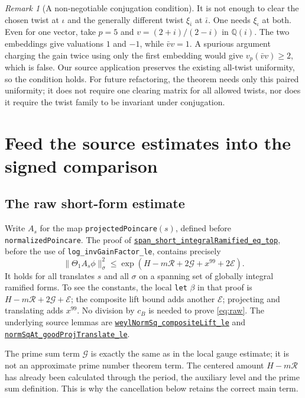 \documentclass[11pt,letterpaper]{article}
\theoremstyle{remark}\newtheorem{remark}[theorem]{Remark}
\newcommand{\R}{\mathcal R}\newcommand{\E}{\mathcal E}\newcommand{\Lfour}{\mathcal L}\newcommand{\K}{\mathcal K}\newcommand{\G}{\mathcal G}\newcommand{\Gr}{\operatorname{Gram}}\newcommand{\rk}{\operatorname{rank}}\newcommand{\Height}{\operatorname{HeightLe}}
\newcommand{\src}[3]{\href{https://github.com/VladimirReshetnikov/ProveIt/blob/89d12dd40424f1217fd818d84877b3da52396a3b/Analysis/GeneralizedRiemannHypothesis/Lean/grh/src/#1.lean\#L#2}{\texttt{#3}}}
\begin{document}
\begin{remark}[A non-negotiable conjugation condition]
It is not enough to clear the chosen twist at $\iota$ and the generally different twist $\xi_{\bar\iota}$ at $\bar\iota$. One needs $\xi_\iota$ at both. Even for one vector, take $p=5$ and $v=(2+i)/(2-i)$ in $\mathbb Q(i)$. The two embeddings give valuations $1$ and $-1$, while $\bar vv=1$. A spurious argument charging the gain twice using only the first embedding would give $v_p(\bar vv)\ge2$, which is false. Our source application preserves the existing all-twist uniformity, so the condition holds. For future refactoring, the theorem needs only this paired uniformity; it does not require one clearing matrix for all allowed twists, nor does it require the twist family to be invariant under conjugation.
\end{remark}

\section{Feed the source estimates into the signed comparison}\label{sec:assembly}
\subsection{The raw short-form estimate}
Write $A_s$ for the map \texttt{projectedPoincare}$(s)$, defined before \texttt{normalizedPoincare}. The proof of \src{New/Reduction/ShortAndEnough}{254}{span\_short\_integralRamified\_eq\_top}, before the use of \texttt{log\_invGainFactor\_le}, contains precisely
\begin{equation}\label{eq:raw}
 \|\Theta_1 A_s\phi\|_\sigma^2\le\exp\left(H-m\R+2\G+x^{99}+2\E\right).
\end{equation}
It holds for all translates $s$ and all $\sigma$ on a spanning set of globally integral ramified forms. To see the constants, the local \texttt{let} $\beta$ in that proof is $H-m\R+2\G+\E$; the composite lift bound adds another $\E$; projecting and translating adds $x^{99}$. No division by $c_B$ is needed to prove \eqref{eq:raw}. The underlying source lemmas are \src{New/UpperBound/Size/ArchimedeanSize}{436}{weylNormSq\_compositeLift\_le} and \src{New/UpperBound/Size/ArchimedeanSize}{526}{normSqAt\_goodProjTranslate\_le}.

The prime sum term $\G$ is exactly the same as in the local gauge estimate; it is not an approximate prime number theorem term. The centered amount $H-m\R$ has already been calculated through the period, the auxiliary level and the prime sum definition. This is why the cancellation below retains the correct main term.
\end{document}
